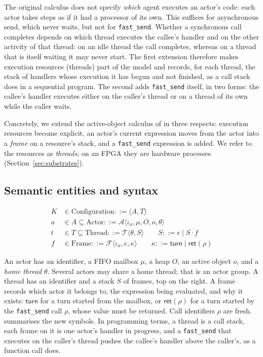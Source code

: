 \documentclass[11pt]{article}
\theoremstyle{definition}
\theoremstyle{remark}
\newcommand{\fs}{\texttt{fast\_send}}
\newcommand{\Act}[1]{\mathcal{A}\langle #1\rangle}
\newcommand{\Thr}[1]{\mathcal{T}\langle #1\rangle}
\newcommand{\Frm}[1]{\mathcal{F}\langle #1\rangle}
\newcommand{\turn}{\mathsf{turn}}
\newcommand{\ret}[1]{\mathsf{ret}(#1)}
\begin{document}
The original calculus does not specify \emph{which} agent executes an actor's code: each
actor takes steps as if it had a processor of its own. This suffices for asynchronous
send, which never waits, but not for \fs{}. Whether a synchronous call completes depends
on which thread executes the callee's handler and on the other activity of that thread:
on an idle thread the call completes, whereas on a thread that is itself waiting it may
never start. The first extension therefore makes execution resources (threads) part of
the model and records, for each thread, the stack of handlers whose execution it has
begun and not finished, as a call stack does in a sequential program. The second adds
\fs{} itself, in two forms: the callee's handler executes either on the caller's thread
or on a thread of its own while the caller waits.

Concretely, we extend the active-object calculus of \cite{dekoster2024} in three
respects: execution resources become explicit, an actor's current expression moves from
the actor into a \emph{frame} on a resource's stack, and a \fs{} expression is added. We
refer to the resources as \emph{threads}; on an FPGA they are hardware processes
(Section~\ref{sec:substrates}).

\subsection{Semantic entities and syntax}

\begin{align*}
K &\in \text{Configuration} ::= \langle A, T\rangle\\
a &\in A \subseteq \text{Actor} ::= \Act{\iota_a, \mu, O, o, \theta}\\
t &\in T \subseteq \text{Thread} ::= \Thr{\theta, S}\qquad S ::= \epsilon \mid S\cdot f\\
f &\in \text{Frame} ::= \Frm{\iota_a, e, \kappa}\qquad \kappa ::= \turn \mid \ret{\rho}
\end{align*}

An actor has an identifier, a FIFO mailbox $\mu$, a heap $O$, an active object $o$, and
a \emph{home thread} $\theta$. Several actors may share a home thread; that is an actor
group. A thread has an identifier and a stack $S$ of frames, top on the right. A frame
records which actor it belongs to, the expression being evaluated, and why it exists:
$\turn$ for a turn started from the mailbox, or $\ret{\rho}$ for a turn started by the
\fs{} call $\rho$, whose value must be returned. Call identifiers $\rho$ are fresh.
 summarises the new symbols. In programming terms, a thread is a
call stack, each frame on it is one actor's handler in progress, and a \fs{} that
executes on the caller's thread pushes the callee's handler above the caller's, as a
function call does.
\end{document}
